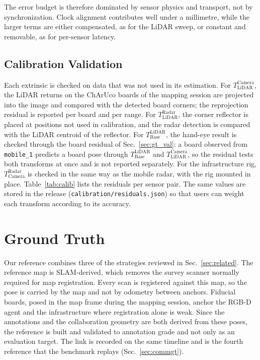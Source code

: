 \documentclass[conference]{IEEEtran}
\newcommand{\Ttransform}[2]{\ensuremath{T_{\mathrm{#1}}^{\mathrm{#2}}}}
\begin{document}
The error budget is therefore dominated by sensor physics and
transport, not by synchronization. Clock alignment contributes well
under a millimetre, while the larger terms are either compensated,
as for the LiDAR sweep, or constant and removable, as for per-sensor
latency.

\subsection{Calibration Validation}
\label{sec:calib_val}
Each extrinsic is checked on data that was not used in its
estimation. For \Ttransform{LiDAR}{Camera}, the LiDAR returns on the
ChArUco boards of the mapping session are projected into the image
and compared with the detected board corners; the reprojection
residual is reported per board and per range. For
\Ttransform{LiDAR}{Radar}, the corner reflector is placed at
positions not used in calibration, and the radar detection is
compared with the LiDAR centroid of the reflector. For
\Ttransform{Base}{LiDAR}, the hand-eye result is checked through the
board residual of Sec.~\ref{sec:gt_val}: a board observed from
\texttt{mobile\_1} predicts a board pose through
\Ttransform{Base}{LiDAR} and \Ttransform{LiDAR}{Camera}, so the
residual tests both transforms at once and is not reported
separately. For the infrastructure rig, \Ttransform{Camera}{Radar} is
checked in the same way as the mobile radar, with the rig mounted in
place. Table~\ref{tab:calib} lists the residuals per sensor pair. The
same values are stored in the release
(\texttt{calibration/residuals.json}) so that users can weight each
transform according to its accuracy.



\section{Ground Truth}
\label{sec:groundtruth}
Our reference combines three of the strategies reviewed in
Sec.~\ref{sec:related}. The reference map is SLAM-derived, which
removes the survey scanner normally required for map registration.
Every scan is registered against this map, so the pose is carried by
the map and not by odometry between anchors. Fiducial boards, posed
in the map frame during the mapping session, anchor the RGB-D agent
and the infrastructure where registration alone is weak. Since the
annotations and the collaboration geometry are both derived from
these poses, the reference is built and validated to annotation
grade and not only as an evaluation target. The link is recorded on
the same timeline and is the fourth reference that the benchmark
replays (Sec.~\ref{sec:commgt}).
\end{document}
